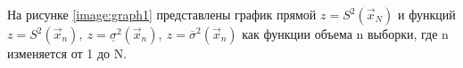 На рисунке \ref{image:graph1} представлены график прямой $z=S^2(\vec x_N)$ и функций \newline $z=S^2(\vec x_n),\ z=\underline\sigma^2(\vec x_n),\  z=\overline\sigma^2(\vec x_n)$ как функции объема n выборки, где n изменяется от 1 до N.
\begin{figure}[H]
\end{figure}